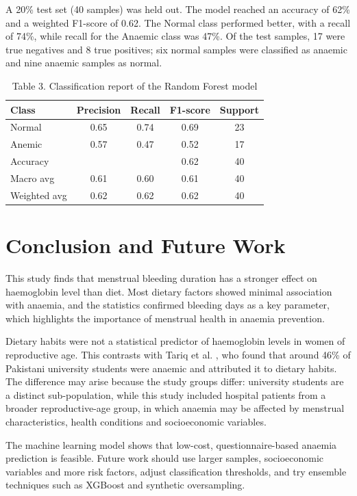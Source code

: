 \documentclass{article}
\begin{document}
A 20\% test set (40 samples) was held out. The model reached an accuracy of 62\% and a weighted F1-score of 0.62. The Normal class performed better, with a recall of 74\%, while recall for the Anaemic class was 47\%. Of the test samples, 17 were true negatives and 8 true positives; six normal samples were classified as anaemic and nine anaemic samples as normal.

\begin{table}
\caption{Table 3. Classification report of the Random Forest model}
\begin{tabular}{|l|c|c|c|c|}
\hline
Class & Precision & Recall & F1-score & Support \\
\hline
Normal & 0.65 & 0.74 & 0.69 & 23 \\
Anemic & 0.57 & 0.47 & 0.52 & 17 \\
Accuracy & & & 0.62 & 40 \\
Macro avg & 0.61 & 0.60 & 0.61 & 40 \\
Weighted avg & 0.62 & 0.62 & 0.62 & 40 \\
\hline
\end{tabular}
\end{table}

\section{Conclusion and Future Work}
This study finds that menstrual bleeding duration has a stronger effect on haemoglobin level than diet. Most dietary factors showed minimal association with anaemia, and the statistics confirmed bleeding days as a key parameter, which highlights the importance of menstrual health in anaemia prevention.

Dietary habits were not a statistical predictor of haemoglobin levels in women of reproductive age. This contrasts with Tariq et al. \cite{tariq}, who found that around 46\% of Pakistani university students were anaemic and attributed it to dietary habits. The difference may arise because the study groups differ: university students are a distinct sub-population, while this study included hospital patients from a broader reproductive-age group, in which anaemia may be affected by menstrual characteristics, health conditions and socioeconomic variables.

The machine learning model shows that low-cost, questionnaire-based anaemia prediction is feasible. Future work should use larger samples, socioeconomic variables and more risk factors, adjust classification thresholds, and try ensemble techniques such as XGBoost and synthetic oversampling.
\end{document}
